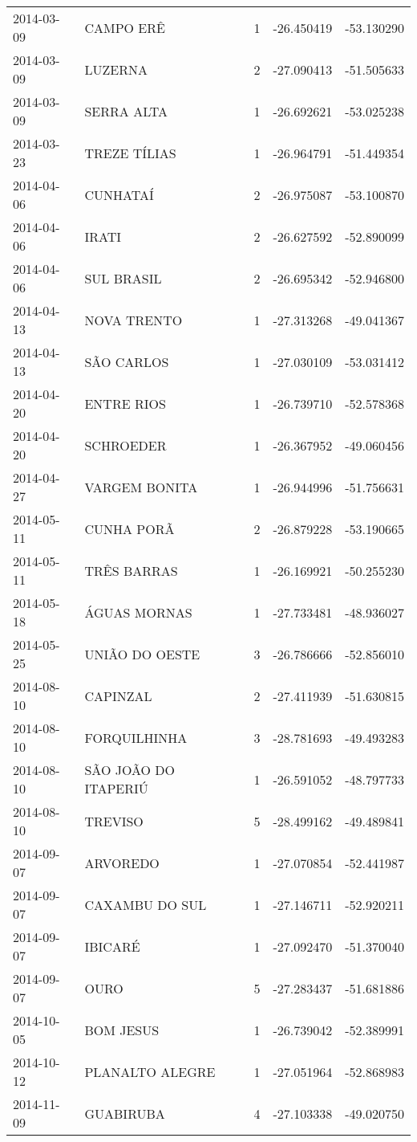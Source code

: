 \documentclass[
	12pt,				%
	openright,			%
	oneside,			%
	a4paper,			%
	english,			%
	french,				%
	spanish,			%
	brazil				%
	dvipsnames, table]{abntex2}
\begin{document}
\begin{longtable}[htbp]{llcrr}
2014-03-09 & CAMPO ERÊ & 1 & -26.450419 & -53.130290 \\
2014-03-09 & LUZERNA & 2 & -27.090413 & -51.505633 \\
2014-03-09 & SERRA ALTA & 1 & -26.692621 & -53.025238 \\
2014-03-23 & TREZE TÍLIAS & 1 & -26.964791 & -51.449354 \\
2014-04-06 & CUNHATAÍ & 2 & -26.975087 & -53.100870 \\
2014-04-06 & IRATI & 2 & -26.627592 & -52.890099 \\
2014-04-06 & SUL BRASIL & 2 & -26.695342 & -52.946800 \\
2014-04-13 & NOVA TRENTO & 1 & -27.313268 & -49.041367 \\
2014-04-13 & SÃO CARLOS & 1 & -27.030109 & -53.031412 \\
2014-04-20 & ENTRE RIOS & 1 & -26.739710 & -52.578368 \\
2014-04-20 & SCHROEDER & 1 & -26.367952 & -49.060456 \\
2014-04-27 & VARGEM BONITA & 1 & -26.944996 & -51.756631 \\
2014-05-11 & CUNHA PORÃ & 2 & -26.879228 & -53.190665 \\
2014-05-11 & TRÊS BARRAS & 1 & -26.169921 & -50.255230 \\
2014-05-18 & ÁGUAS MORNAS & 1 & -27.733481 & -48.936027 \\
2014-05-25 & UNIÃO DO OESTE & 3 & -26.786666 & -52.856010 \\
2014-08-10 & CAPINZAL & 2 & -27.411939 & -51.630815 \\
2014-08-10 & FORQUILHINHA & 3 & -28.781693 & -49.493283 \\
2014-08-10 & SÃO JOÃO DO ITAPERIÚ & 1 & -26.591052 & -48.797733 \\
2014-08-10 & TREVISO & 5 & -28.499162 & -49.489841 \\
2014-09-07 & ARVOREDO & 1 & -27.070854 & -52.441987 \\
2014-09-07 & CAXAMBU DO SUL & 1 & -27.146711 & -52.920211 \\
2014-09-07 & IBICARÉ & 1 & -27.092470 & -51.370040 \\
2014-09-07 & OURO & 5 & -27.283437 & -51.681886 \\
2014-10-05 & BOM JESUS & 1 & -26.739042 & -52.389991 \\
2014-10-12 & PLANALTO ALEGRE & 1 & -27.051964 & -52.868983 \\
2014-11-09 & GUABIRUBA & 4 & -27.103338 & -49.020750 \\

\end{longtable}
\end{document}
